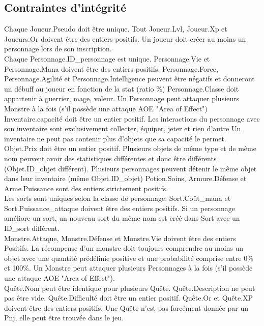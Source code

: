 \documentclass[utf8]{article}
\begin{document}
\subsection{Contraintes d'intégrité}
Chaque Joueur.Pseudo doit être unique. 
Tout Joueur.Lvl, Joueur.Xp et Joueurs.Or doivent être des entiers positifs.
Un joueur doit créer au moins un personnage lors de son inscription. \\

Chaque Personnage.ID_personnage est unique.
Personnage.Vie et Personnage.Mana doivent être des entiers positifs.
Personnage.Force, Personnage.Agilité et Personnage.Intelligence peuvent être négatifs et donneront un débuff au joueur en fonction de la stat (ratio \%)
Personnage.Classe doit appartenir à {guerrier, mage, voleur}.
Un Personnage peut attaquer plusieurs Monstre à la fois (s'il possède une attaque AOE "Area of Effect")\\

Inventaire.capacité doit être un entier positif.
Les interactions du personnage avec son inventaire sont exclusivement {collecter, équiper, jeter} et rien d'autre
Un inventaire ne peut pas contenir plus d'objets que sa capacité le permet.\\

Objet.Prix doit être un entier positif. 
Plusieurs objets de même type et de même nom peuvent avoir des statistiques différentes et donc être différents (Objet.ID_objet différent).
Plusieurs personnages peuvent détenir le même objet dans leur inventaire (même Objet.ID_objet)
Potion.Soins, Armure.Défense et Arme.Puissance sont des entiers strictement positifs.\\

Les sorts sont uniques selon la classe de personnage.
Sort.Coût_mana et Sort.Puissance_attaque doivent être des entiers positifs.
Si un personnage améliore un sort, un nouveau sort du même nom est créé dans Sort avec un ID_sort différent.\\ 

Monstre.Attaque, Monstre.Défense et Monstre.Vie doivent être des entiers Positifs. 
La récompense d'un monstre doit toujours comprendre au moins un objet avec une quantité prédéfinie positive et une probabilité comprise entre 0\% et 100\%.
Un Monstre peut attaquer plusieurs Personnages à la fois (s'il possède une attaque AOE "Area of Effect").\\

Quête.Nom peut être identique pour plusieurs Quête.
Quête.Description ne peut pas être vide.
Quête.Difficulté doit être un entier positif.
Quête.Or et Quête.XP doivent être des entiers positifs.
Une Quête n'est pas forcément donnée par un Pnj, elle peut être trouvée dans le jeu.\\
\end{document}
